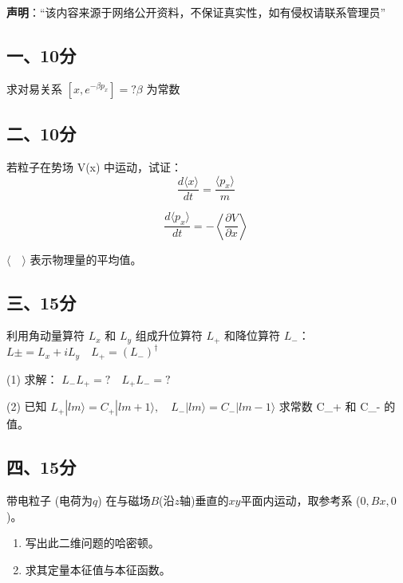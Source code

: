 
\textbf{声明}：“该内容来源于网络公开资料，不保证真实性，如有侵权请联系管理员”

\subsection{一、10分}
求对易关系 $[x, e^{-\beta p_x}] = ? \beta$ 为常数
\subsection{二、10分}
若粒子在势场  V(x) 中运动，试证：
$$\frac{d \langle x \rangle}{dt} = \frac{\langle p_x \rangle}{m}~$$

$$\frac{d \langle p_x \rangle}{dt} = -\left\langle \frac{\partial V}{\partial x} \right\rangle~$$

$\langle \quad \rangle$ 表示物理量的平均值。
\subsection{三、15分}
利用角动量算符 $L_x$ 和 $L_y$ 组成升位算符 $L_+$ 和降位算符 $L_-$：
$L\pm = L_x + i L_y \quad L_+ = (L_-)^\dagger$

(1) 求解： $L_- L_+ = ? \quad L_+ L_- = ?$

(2) 已知 $L_+ |l m \rangle = C_+ |lm + 1 \rangle, \quad L_- |lm \rangle = C_- |lm - 1 \rangle$
求常数 C_+ 和 C_- 的值。
\subsection{四、15分}
带电粒子 (电荷为$q$) 在与磁场$B$(沿$z$轴)垂直的$xy$平面内运动，取参考系 ($0, Bx, 0$)。
\begin{enumerate}
\item 写出此二维问题的哈密顿。
\item 求其定量本征值与本征函数。
\end{enumerate}
